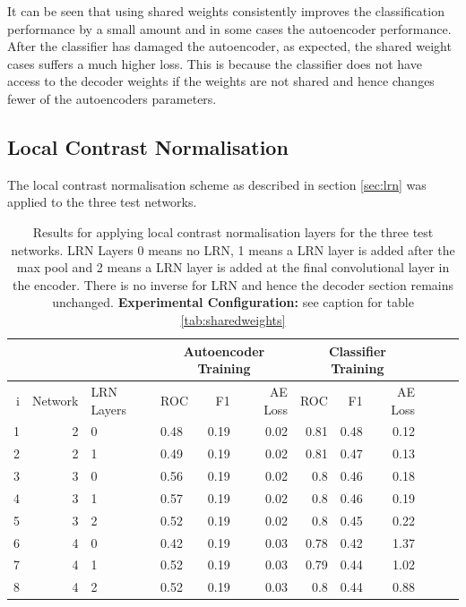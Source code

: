       It can be seen that using shared weights consistently improves the classification
      performance by a small amount and in some cases the autoencoder performance. After the classifier has
      damaged the autoencoder, as expected, the shared weight cases suffers a much higher loss. This is
      because the classifier does not have access to the decoder weights if the weights are not shared and hence
      changes fewer of the autoencoders parameters.
    \subsection{Local Contrast Normalisation}

      The local contrast normalisation scheme as described in section \ref{sec:lrn}
      was applied to the three test networks.

      \begin{table}[!h] \centering
      {\footnotesize
      \begin{tabular}{rrllrrrrrrrr}
        &&&   \multicolumn{3}{|c|}{Autoencoder Training} &  \multicolumn{3}{c|}{Classifier Training}    \\
      \hline
        i & Network             & LRN Layers   &    ROC&F1&AE Loss & ROC & F1 & AE Loss \\
      \hline
       1 & 2 & 0  &    0.48 &   0.19 &     0.02 &    0.81 &   0.48 &     0.12 \\
       2 & 2 & 1  &    0.49 &   0.19 &     0.02 &    0.81 &   0.47 &     0.13 \\
      \hline
       3 & 3 & 0  &    0.56 &   0.19 &     0.02 &    0.8  &   0.46 &     0.18 \\
       4 & 3 & 1  &    0.57 &   0.19 &     0.02 &    0.8  &   0.46 &     0.19 \\
       5 & 3 & 2  &    0.52 &   0.19 &     0.02 &    0.8  &   0.45 &     0.22 \\
      \hline
       6 & 4 & 0  &    0.42 &   0.19 &     0.03 &    0.78 &   0.42 &     1.37 \\
       7 & 4 & 1  &    0.52 &   0.19 &     0.03 &    0.79 &   0.44 &     1.02 \\
       8 & 4 & 2  &    0.52 &   0.19 &     0.03 &    0.8  &   0.44 &     0.88 \\
      \hline
      \end{tabular}}\caption{Results for applying local contrast normalisation layers
      for the three test networks. LRN Layers 0 means no LRN, 1 means a LRN layer is added after the max pool
      and 2 means a LRN layer is added at the final convolutional layer in the encoder. There is no
      inverse for LRN and hence the decoder section remains unchanged. {\bf Experimental Configuration:} see caption
      for table \ref{tab:sharedweights}}\label{tab:lrn}  \end{table}


